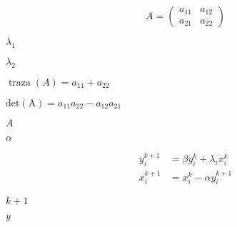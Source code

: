 \documentclass[10pt]{book}
\begin{document}
\begin{mdSnippets}
\begin{mdDisplaySnippet}[a57d9a986591160954a5faa7739ff1ae]%
\[%
A=\begin{pmatrix}
a_{11}&a_{12}\\
a_{21}&a_{22}
\end{pmatrix} 
\]%
\end{mdDisplaySnippet}%
\begin{mdInlineSnippet}[ef8865f6e97b1f942ba13021e6302cb4]%
$\lambda_1$\end{mdInlineSnippet}%
\begin{mdInlineSnippet}[fa114695aec226f8062b6702f7c89dd8]%
$\lambda_2$\end{mdInlineSnippet}%
\begin{mdInlineSnippet}%
$\operatorname{traza}(A)=a_{11} + a_{22}$\end{mdInlineSnippet}%
\begin{mdInlineSnippet}[decfc2858537f3b6347f4f7949d168f3]%
$\operatorname{det(A)}=a_{11}a_{22}-a_{12}a_{21}$\end{mdInlineSnippet}%
\begin{mdInlineSnippet}[7fc56270e7a70fa81a5935b72eacbe29]%
$A$\end{mdInlineSnippet}%
\begin{mdInlineSnippet}[7b7f9dbfea05c83784f8b85149852f08]%
$\alpha$\end{mdInlineSnippet}%
\begin{mdDisplaySnippet}[196ae4117aab1385b7a96e475638860d]%
\[%
\begin{aligned}
y_{i}^{k+1} &=\beta y_{i}^{k}+\lambda_{i} x_{i}^{k} \\
x_{i}^{k+1} &=x_{i}^{k}-\alpha y_{i}^{k+1}
\end{aligned}   
\]%
\end{mdDisplaySnippet}%
\begin{mdInlineSnippet}[a31a860e7a59c7616c1515ec3ae652a6]%
$k+1$\end{mdInlineSnippet}%
\begin{mdInlineSnippet}[415290769594460e2e485922904f345d]%
$y$\end{mdInlineSnippet}%

\end{mdSnippets}
\end{document}

